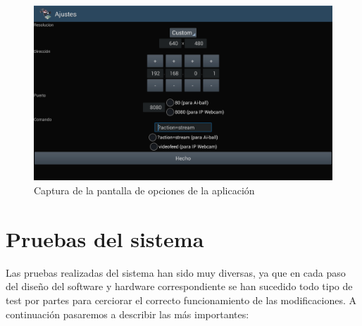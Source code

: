 \documentclass{pclass}
\begin{document}
\begin{itemize}
\begin{itemize}
	\begin{figure}[H]
		\centering
		\includegraphics[width=1\textwidth]{img/opciones}
		\caption{Captura de la pantalla de opciones de la aplicación}
		\label{fig:capturaOpciones}
	\end{figure}
	
	
	\medskip
	
\end{itemize}
\end{itemize}


\section{Pruebas del sistema} 

Las pruebas realizadas del sistema han sido muy diversas, ya que en cada paso del diseño del software y hardware correspondiente se han sucedido todo tipo de test por partes para cerciorar el correcto funcionamiento de las modificaciones. A continuación pasaremos a describir las más importantes:
\end{document}

